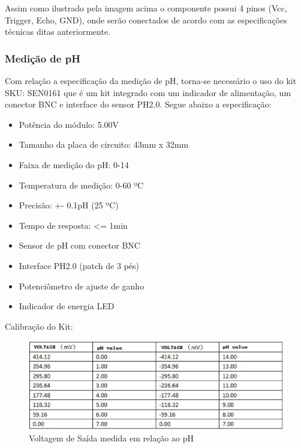 Assim como ilustrado pela imagem acima o componente possui 4 pinos (Vcc, Trigger, Echo, GND), onde serão conectados de acordo com as especificações técnicas ditas anteriormente.

\subsubsection{Medição de pH}

Com relação a especificação da medição de pH, torna-se necessário o uso do kit SKU: SEN0161 que é um kit integrado com um indicador de alimentação, um conector BNC e interface do sensor PH2.0. Segue abaixo a especificação:

\begin{itemize}
  \item Potência do módulo: 5.00V
  \item Tamanho da placa de circuito: 43mm x 32mm
  \item Faixa de medição do pH: 0-14
  \item Temperatura de medição: 0-60 ºC
  \item Precisão: +- 0.1pH (25 ºC)
  \item Tempo de resposta: <=   1min
  \item Sensor de pH com conector BNC
  \item Interface PH2.0 (patch de 3 pés)
  \item Potenciômetro de ajuste de ganho
  \item Indicador de energia LED
\end{itemize}

Calibração do Kit:

\begin{figure}[h]
	\centering
	\includegraphics[keepaspectratio=true,scale=0.6]{figuras/ph.eps}
	\caption{Voltagem de Saída medida em relação ao pH}
	\label{ph}
\end{figure}

